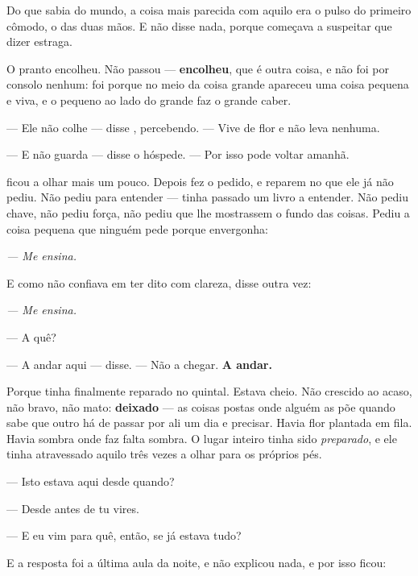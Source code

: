 \documentclass[livro.tex]{subfiles}
\begin{document}
\medskip
\noindent Do que \Ben sabia do mundo, a coisa mais parecida com aquilo era o
pulso do primeiro cômodo, o das duas mãos. E não disse nada, porque começava a
suspeitar que dizer estraga.

\medskip
\noindent O pranto encolheu. Não passou --- \textbf{encolheu}, que é outra
coisa, e não foi por consolo nenhum: foi porque no meio da coisa grande apareceu
uma coisa pequena e viva, e o pequeno ao lado do grande faz o grande caber.

\medskip
\noindent --- Ele não colhe --- disse \Ben , percebendo. --- Vive de flor e não
leva nenhuma.

--- E não guarda --- disse o hóspede. --- Por isso pode voltar amanhã.

\medskip
\noindent \Ben ficou a olhar mais um pouco. Depois fez o pedido, e reparem no
que ele já não pediu. Não pediu para entender --- tinha passado um livro a
entender. Não pediu chave, não pediu força, não pediu que lhe mostrassem o
fundo das coisas. Pediu a coisa pequena que ninguém pede porque envergonha:

\begin{center}
\emph{--- Me ensina.}
\end{center}

\noindent E como não confiava em ter dito com clareza, disse outra vez:

\begin{center}
\emph{--- Me ensina.}
\end{center}

\medskip
\noindent --- A quê?

--- A andar aqui --- disse. --- Não a chegar. \textbf{A andar.}

\medskip
\noindent Porque tinha finalmente reparado no quintal. Estava cheio. Não
crescido ao acaso, não bravo, não mato: \textbf{deixado} --- as coisas postas
onde alguém as põe quando sabe que outro há de passar por ali um dia e
precisar. Havia flor plantada em fila. Havia sombra onde faz falta sombra. O
lugar inteiro tinha sido \emph{preparado}, e ele tinha atravessado aquilo três
vezes a olhar para os próprios pés.

\medskip
\noindent --- Isto estava aqui desde quando?

--- Desde antes de tu vires.

\medskip
\noindent --- E eu vim para quê, então, se já estava tudo?

E a resposta foi a última aula da noite, e não explicou nada, e por isso ficou:
\end{document}
